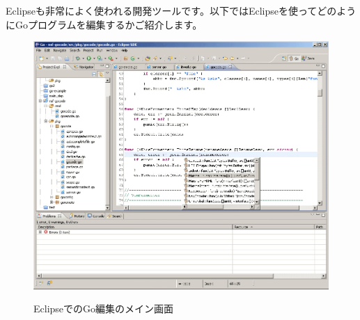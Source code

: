 Eclipseも非常によく使われる開発ツールです。以下ではEclipseを使ってどのようにGoプログラムを編集するかご紹介します。

\begin{figure}[H]
  \includegraphics[width=14cm]{1.4.eclipse1.png}
   \label{図1.11}
   \caption{EclipseでのGo編集のメイン画面}
\end{figure}

